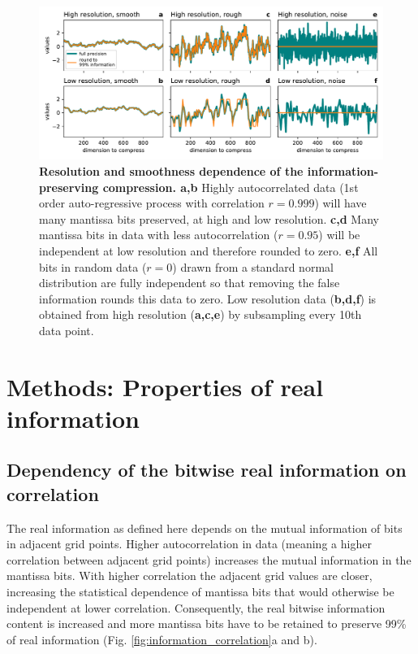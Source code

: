 \begin{figure}[tbhp]
	\includegraphics[width=1\textwidth]{Figures/compression/resolution_information.pdf}
	\caption{\textbf{Resolution and smoothness dependence of the information-preserving compression. a,b}
	Highly autocorrelated data (1st order auto-regressive process with correlation $r=0.999$) will have many
	mantissa bits preserved, at high and low resolution. \textbf{c,d} Many mantissa bits in data with less autocorrelation
	($r=0.95$) will be independent at low resolution and therefore rounded to zero. \textbf{e,f} All bits in random data ($r=0$)
	drawn from a standard normal distribution are fully independent so that removing the false information rounds
	this data to zero. Low resolution data (\textbf{b,d,f}) is obtained from high resolution (\textbf{a,c,e}) by subsampling every
	10th data point.}
	\label{fig:information_resolution}
\end{figure}

\section{Methods: Properties of real information}
\label{sec:compression_methods_properties}

\subsection{Dependency of the bitwise real information on correlation}

The real information as defined here depends on the mutual information of bits in adjacent grid points.
Higher autocorrelation in data (meaning a higher correlation between adjacent grid points) increases the
mutual information in the mantissa bits. With higher correlation the adjacent grid values are closer,
increasing the statistical dependence of mantissa bits that would otherwise be independent at lower correlation.
Consequently, the real bitwise information content is increased and more mantissa bits have to be retained to
preserve 99\% of real information (Fig. \ref{fig:information_correlation}a and b).

